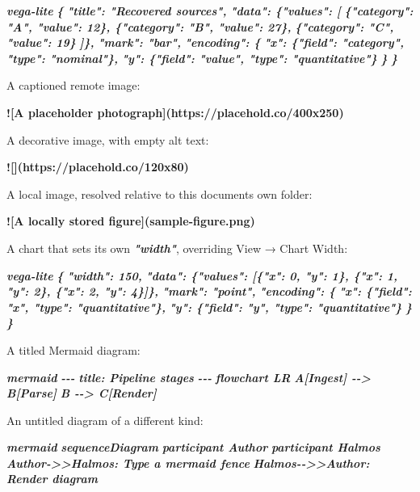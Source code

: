 \documentclass[
]{article}
\newenvironment{Shaded}{}{}
\newcommand{\AlertTok}[1]{\textcolor[rgb]{1.00,0.00,0.00}{\textbf{#1}}}
\newcommand{\InformationTok}[1]{\textcolor[rgb]{0.38,0.63,0.69}{\textbf{\textit{#1}}}}
\newcommand{\NormalTok}[1]{#1}
\begin{document}
\begin{Shaded}
\begin{Highlighting}[]
\InformationTok{\textasciigrave{}\textasciigrave{}\textasciigrave{}vega{-}lite}
\InformationTok{\{}
\InformationTok{  "title": "Recovered sources",}
\InformationTok{  "data": \{"values": [}
\InformationTok{    \{"category": "A", "value": 12\}, \{"category": "B", "value": 27\},}
\InformationTok{    \{"category": "C", "value": 19\}}
\InformationTok{  ]\},}
\InformationTok{  "mark": "bar",}
\InformationTok{  "encoding": \{}
\InformationTok{    "x": \{"field": "category", "type": "nominal"\},}
\InformationTok{    "y": \{"field": "value", "type": "quantitative"\}}
\InformationTok{  \}}
\InformationTok{\}}
\InformationTok{\textasciigrave{}\textasciigrave{}\textasciigrave{}}

\NormalTok{A captioned remote image:}

\AlertTok{![A placeholder photograph](https://placehold.co/400x250)}

\NormalTok{A decorative image, with empty alt text:}

\AlertTok{![](https://placehold.co/120x80)}

\NormalTok{A local image, resolved relative to this document\textquotesingle{}s own folder:}

\AlertTok{![A locally stored figure](sample{-}figure.png)}

\NormalTok{A chart that sets its own }\InformationTok{\textasciigrave{}"width"\textasciigrave{}}\NormalTok{, overriding View → Chart Width:}

\InformationTok{\textasciigrave{}\textasciigrave{}\textasciigrave{}vega{-}lite}
\InformationTok{\{}
\InformationTok{  "width": 150,}
\InformationTok{  "data": \{"values": [\{"x": 0, "y": 1\}, \{"x": 1, "y": 2\}, \{"x": 2, "y": 4\}]\},}
\InformationTok{  "mark": "point",}
\InformationTok{  "encoding": \{}
\InformationTok{    "x": \{"field": "x", "type": "quantitative"\},}
\InformationTok{    "y": \{"field": "y", "type": "quantitative"\}}
\InformationTok{  \}}
\InformationTok{\}}
\InformationTok{\textasciigrave{}\textasciigrave{}\textasciigrave{}}

\NormalTok{A titled Mermaid diagram:}

\InformationTok{\textasciigrave{}\textasciigrave{}\textasciigrave{}mermaid}
\InformationTok{{-}{-}{-}}
\InformationTok{title: Pipeline stages}
\InformationTok{{-}{-}{-}}
\InformationTok{flowchart LR}
\InformationTok{  A[Ingest] {-}{-}\textgreater{} B[Parse]}
\InformationTok{  B {-}{-}\textgreater{} C[Render]}
\InformationTok{\textasciigrave{}\textasciigrave{}\textasciigrave{}}

\NormalTok{An untitled diagram of a different kind:}

\InformationTok{\textasciigrave{}\textasciigrave{}\textasciigrave{}mermaid}
\InformationTok{sequenceDiagram}
\InformationTok{  participant Author}
\InformationTok{  participant Halmos}
\InformationTok{  Author{-}\textgreater{}\textgreater{}Halmos: Type a mermaid fence}
\InformationTok{  Halmos{-}{-}\textgreater{}\textgreater{}Author: Render diagram}
\InformationTok{\textasciigrave{}\textasciigrave{}\textasciigrave{}}
\end{Highlighting}
\end{Shaded}
\end{document}
